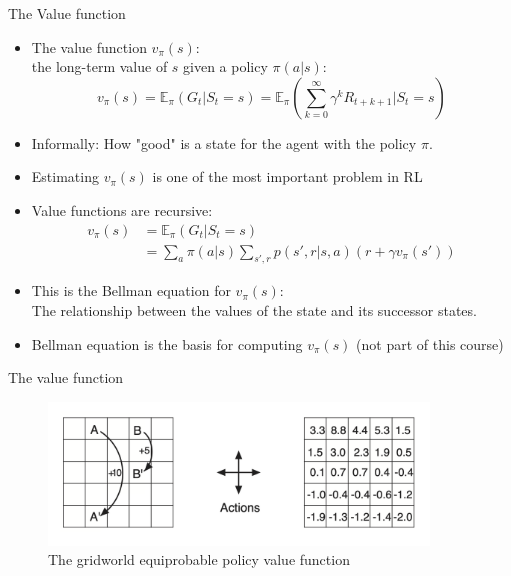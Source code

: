 \documentclass[10pt]{beamer}
\begin{document}
\begin{frame}{The Value function}

\begin{itemize}
\item The value function $v_{\pi}(s)$: \\the long-term value of $s$ given a policy $\pi(a|s)$:
\[
v_{\pi}(s) = \mathbb{E}_\pi(G_t|S_t = s) = \mathbb{E}_\pi\left(\sum^\infty_{k=0} \gamma^k R_{t+k+1} | S_t=s \right)
\]
\pause
\item Informally: How "good" is a state for the agent with the policy $\pi$.\pause
\item Estimating $v_{\pi}(s)$ is one of the most important problem in RL\pause
\item Value functions are {\color{uured}recursive}:
\begin{align*}
       v_{\pi}(s) & = \mathbb{E}_\pi(G_t|S_t = s)      \\
                  & = \sum_a \pi(a|s) \sum_{s',r} p(s', r|s,a) (r + \gamma v_{\pi}(s'))
\end{align*}
\item This is the {\color{uured}Bellman equation} for $v_\pi(s)$: \\The relationship between the values of the state and its successor states.\pause
\item Bellman equation is the basis for computing $v_\pi(s)$ (not part of this course)

\end{itemize}

\end{frame}


\begin{frame}{The value function}

\begin{figure}[h]
\centering
\includegraphics[width=0.9\textwidth]{fig/sutton_fig_3_5.png}
\caption{The gridworld equiprobable policy value function}
\end{figure}

\end{frame}
\end{document}
